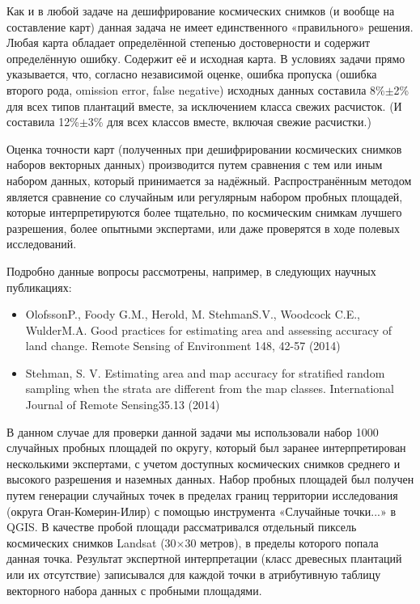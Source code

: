 Как и в любой задаче на дешифрирование космических снимков (и вообще на составление карт) данная задача не имеет единственного «правильного» решения. Любая карта обладает определённой степенью достоверности и содержит определённую ошибку. Содержит её и исходная карта. В условиях задачи прямо указывается, что, согласно независимой оценке, ошибка пропуска (ошибка второго рода, omission error, false negative) исходных данных составила 8\%$\pm$2\% для всех типов плантаций вместе, за исключением класса свежих расчисток. (И составила 12\%$\pm$3\% для всех классов вместе, включая свежие расчистки.)

Оценка точности карт (полученных при дешифрировании космических снимков наборов векторных данных) производится путем сравнения с тем или иным набором данных, который принимается за надёжный. Распространённым методом является сравнение со случайным или регулярным набором пробных площадей, которые интерпретируются более тщательно, по космическим снимкам лучшего разрешения, более опытными экспертами, или даже проверятся в ходе полевых исследований.

Подробно данные вопросы рассмотрены, например, в следующих научных публикациях:
\begin{itemize}
    \item OlofssonP., Foody G.M., Herold, M. StehmanS.V., Woodcock C.E., WulderM.A. Good practices for estimating area and assessing accuracy of land change. Remote Sensing of Environment 148, 42-57 (2014)
    \item Stehman, S. V. Estimating area and map accuracy for stratified random sampling when the strata are different from the map classes. International Journal of Remote Sensing35.13 (2014)
\end{itemize}

В данном случае для проверки данной задачи мы использовали набор 1000 случайных пробных площадей по округу, который был заранее интерпретирован несколькими экспертами, с учетом доступных космических снимков среднего и высокого разрешения и наземных данных. Набор пробных площадей был получен путем генерации случайных точек в пределах границ территории исследования (округа Оган-Комерин-Илир) с помощью инструмента «Случайные точки...» в QGIS. В качестве пробой площади рассматривался отдельный пиксель космических снимков Landsat (30$\times$30 метров), в пределы которого попала данная точка. Результат экспертной интерпретации (класс древесных плантаций или их отсутствие) записывался для каждой точки в атрибутивную таблицу векторного набора данных с пробными площадями.

